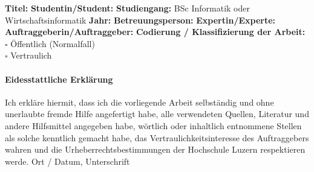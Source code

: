 \documentclass[10.5pt]{article}
\begin{document}
\fontsize{10.5}{12}
\noindent
\textbf{Titel:} \newline \newline
\textbf{Studentin/Student:} \newline \newline
\textbf{Studiengang:} BSc Informatik oder Wirtschaftsinformatik \newline \newline
\textbf{Jahr:} \newline \newline
\textbf{Betreuungsperson:} \newline \newline
\textbf{Expertin/Experte:} \newline \newline
\textbf{Auftraggeberin/Auftraggeber:} \newline \newline \newline
\textbf{Codierung / Klassifizierung der Arbeit:}\\
$\square$ \"Offentlich (Normalfall) \\
$\square$ Vertraulich\\




\paragraph{\textbf{Eidesstattliche Erkl\"arung}}
Ich erkl\"are hiermit, dass ich die vorliegende Arbeit selbst\"andig und ohne unerlaubte fremde Hilfe angefertigt habe, alle verwendeten Quellen, Literatur und andere Hilfsmittel angegeben habe, w\"ortlich oder inhaltlich entnommene Stellen als solche kenntlich gemacht habe, das Vertraulichkeitsinteresse des Auftraggebers wahren und die Urheberrechtsbestimmungen der Hochschule Luzern respektieren werde. \newline \newline 
Ort / Datum, Unterschrift	\underline{\hspace*{4cm}} \newline \newline
\end{document}

